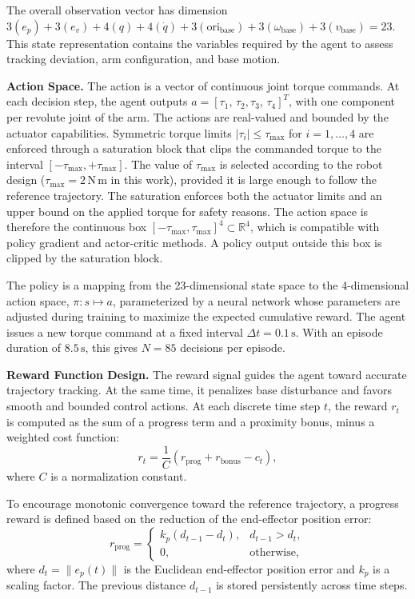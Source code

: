 \documentclass{ieeeaccess}
\begin{document}
The overall observation vector has dimension
$3(e_p) + 3(e_v) + 4(q) + 4(\dot{q}) + 3(\mathrm{ori}_{\mathrm{base}}) + 3(\omega_{\mathrm{base}}) + 3(v_{\mathrm{base}}) = 23$.
This state representation contains the variables required by the agent to assess tracking deviation, arm
configuration, and base motion.

\textbf{Action Space.} The action is a vector of continuous joint torque commands. At each decision step,
the agent outputs $a = [\tau_{1},\, \tau_{2}, \tau_{3},\, \tau_{4}]^T$, with one component per revolute
joint of the arm. The actions are real-valued and bounded by the actuator capabilities. Symmetric torque
limits $|\tau_{i}| \leq \tau_{\max}$ for $i = 1,\ldots,4$ are enforced through a saturation block that
clips the commanded torque to the interval $[-\tau_{\max}, +\tau_{\max}]$. The value of $\tau_{\max}$ is
selected according to the robot design ($\tau_{\max} = 2\,\mathrm{N\,m}$ in this work), provided it is
large enough to follow the reference trajectory. The saturation enforces both the actuator limits and an
upper bound on the applied torque for safety reasons. The action space is therefore the continuous box
$[-\tau_{\max}, \tau_{\max}]^4 \subset \mathbb{R}^4$, which is compatible with policy gradient and
actor-critic methods. A policy output outside this box is clipped by the saturation block.

The policy is a mapping from the 23-dimensional state space to the 4-dimensional action space,
$\pi: s \mapsto a$, parameterized by a neural network whose parameters are adjusted during training to
maximize the expected cumulative reward. The agent issues a new torque command at a fixed interval
$\Delta t = 0.1\,\mathrm{s}$. With an episode duration of $8.5\,\mathrm{s}$, this gives $N = 85$
decisions per episode.


\textbf{Reward Function Design.} The reward signal guides the agent toward accurate trajectory tracking. At the
same time, it penalizes base disturbance and favors smooth and bounded control actions.
At each discrete time step $t$, the reward $r_t$ is computed as the sum
of a progress term and a proximity bonus, minus a weighted cost function:
\begin{equation}
r_t = \frac{1}{C}\left( r_{\mathrm{prog}} + r_{\mathrm{bonus}} - c_t \right),
\label{eq:reward}
\end{equation}
where $C$ is a normalization constant.

To encourage monotonic convergence toward the reference trajectory, a progress reward is defined based
on the reduction of the end-effector position error:
\begin{equation}
r_{\mathrm{prog}} = 
\begin{cases}
k_p \left( d_{t-1} - d_t \right), & d_{t-1} > d_t,\\
0, & \text{otherwise},
\end{cases}
\end{equation}
where $d_t = \|e_p(t)\|$ is the Euclidean end-effector position error and $k_p$ is a
scaling factor. The previous distance $d_{t-1}$ is stored persistently across time steps.
\end{document}
